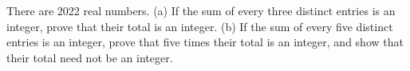 There are 2022 real numbers. (a) If the sum of every three distinct entries is an integer, prove that their total is an integer. (b) If the sum of every five distinct entries is an integer, prove that five times their total is an integer, and show that their total need not be an integer.
